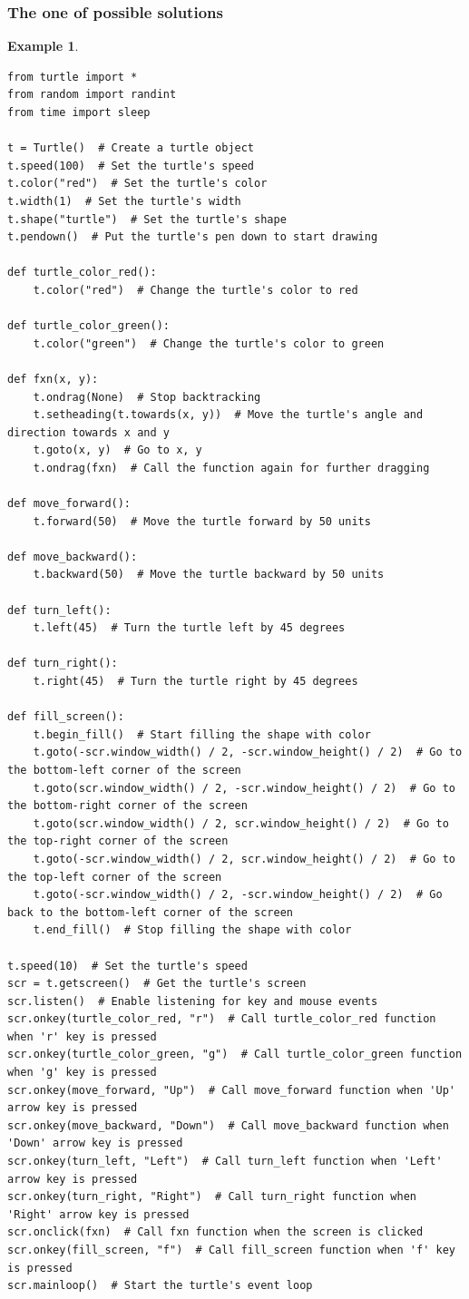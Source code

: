 \documentclass[12pt]{article}
\newtheorem{Example}{Example}[section]
\begin{document}
\subsubsection{The one of possible solutions}
\begin{Example}
\begin{lstlisting}
from turtle import *
from random import randint
from time import sleep

t = Turtle()  # Create a turtle object
t.speed(100)  # Set the turtle's speed
t.color("red")  # Set the turtle's color
t.width(1)  # Set the turtle's width
t.shape("turtle")  # Set the turtle's shape
t.pendown()  # Put the turtle's pen down to start drawing

def turtle_color_red():
    t.color("red")  # Change the turtle's color to red

def turtle_color_green():
    t.color("green")  # Change the turtle's color to green

def fxn(x, y):
    t.ondrag(None)  # Stop backtracking
    t.setheading(t.towards(x, y))  # Move the turtle's angle and direction towards x and y
    t.goto(x, y)  # Go to x, y
    t.ondrag(fxn)  # Call the function again for further dragging

def move_forward():
    t.forward(50)  # Move the turtle forward by 50 units

def move_backward():
    t.backward(50)  # Move the turtle backward by 50 units

def turn_left():
    t.left(45)  # Turn the turtle left by 45 degrees

def turn_right():
    t.right(45)  # Turn the turtle right by 45 degrees

def fill_screen():
    t.begin_fill()  # Start filling the shape with color
    t.goto(-scr.window_width() / 2, -scr.window_height() / 2)  # Go to the bottom-left corner of the screen
    t.goto(scr.window_width() / 2, -scr.window_height() / 2)  # Go to the bottom-right corner of the screen
    t.goto(scr.window_width() / 2, scr.window_height() / 2)  # Go to the top-right corner of the screen
    t.goto(-scr.window_width() / 2, scr.window_height() / 2)  # Go to the top-left corner of the screen
    t.goto(-scr.window_width() / 2, -scr.window_height() / 2)  # Go back to the bottom-left corner of the screen
    t.end_fill()  # Stop filling the shape with color

t.speed(10)  # Set the turtle's speed
scr = t.getscreen()  # Get the turtle's screen
scr.listen()  # Enable listening for key and mouse events
scr.onkey(turtle_color_red, "r")  # Call turtle_color_red function when 'r' key is pressed
scr.onkey(turtle_color_green, "g")  # Call turtle_color_green function when 'g' key is pressed
scr.onkey(move_forward, "Up")  # Call move_forward function when 'Up' arrow key is pressed
scr.onkey(move_backward, "Down")  # Call move_backward function when 'Down' arrow key is pressed
scr.onkey(turn_left, "Left")  # Call turn_left function when 'Left' arrow key is pressed
scr.onkey(turn_right, "Right")  # Call turn_right function when 'Right' arrow key is pressed
scr.onclick(fxn)  # Call fxn function when the screen is clicked
scr.onkey(fill_screen, "f")  # Call fill_screen function when 'f' key is pressed
scr.mainloop()  # Start the turtle's event loop


\end{lstlisting}
\end{Example}
\end{document}
